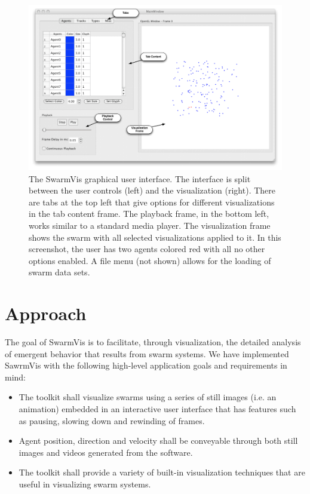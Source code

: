 \documentclass{vgtc}
\begin{document}
\begin{figure}[ht]
\centering
\includegraphics[scale=.45]{images/swarmvis-annotated.pdf}
\caption{The SwarmVis graphical user interface. 
The interface is split between the user controls (left) and the visualization (right).
There are tabs at the top left that give options for different visualizations in the tab content frame.
The playback frame, in the bottom left, works similar to a standard media player.
The visualization frame shows the swarm with all selected visualizations applied to it.
In this screenshot, the user has two agents colored red with all no other options enabled.
A file menu (not shown) allows for the loading of swarm data sets.}
\label{AnnotatedWindow}
\end{figure}

\section{Approach}
The goal of SwarmVis is to facilitate, through visualization, the detailed analysis of emergent behavior that results from swarm systems.
We have implemented SawrmVis
with the following high-level application goals and requirements in mind:
\begin{itemize}
\item The toolkit shall visualize swarms using a series of still images (i.e. an animation)
embedded in an interactive user interface that has features such as pausing, slowing down and rewinding of frames.
\item Agent position, direction and velocity shall be conveyable through both still images and videos generated from the software.
\item The toolkit shall provide a variety of built-in visualization techniques that are useful in visualizing swarm systems.
\end{itemize}
\end{document}
